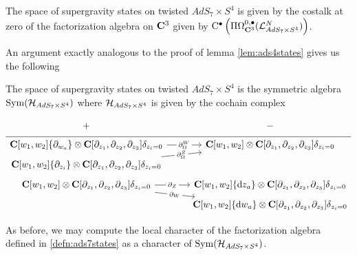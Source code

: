 \documentclass[../main.tex]{subfiles}
\begin{document}
\begin{defn}\label{defn:ads7states}
The space of supergravity states on twisted $AdS_7\times S^4$ is given by the costalk at zero of the factorization algebra on $\mathbf{C}^3$ given by ${\mathrm{C}}^\bullet \left (\Pi \Omega^{0,\bullet}_{\mathbf{C}^3} (\mathcal{L}^N_{AdS_7\times S^4} ) \right )$.
\end{defn}

\parsec{}
An argument exactly analogous to the proof of lemma \ref{lem:ads4states} gives us the following

\begin{lem}
The space of supergravity states on twisted $AdS_7\times S^4$ is the symmetric algebra $\text{Sym} (\mathcal{H}_{AdS_7\times S^4} )$ where $\mathcal{H}_{AdS_7\times S^4}$ is given by the cochain complex

 \begin{equation} 
 \begin{tikzcd}[row sep = 1 ex]
    + & - \\ \hline
\C[w_1,w_2] \{\partial_{w_a}\} \otimes \C[\del_{z_1}, \del_{z_2}, \del_{z_3}]\delta_{z_i=0}\ar[r, "\del^W_\Omega" description] & \C[w_1,w_2]  \otimes \C[\del_{z_1}, \del_{z_2}, \del_{z_3}]\delta_{z_i=0} \\
\C[w_1,w_2]  \{\del_{z_i}\}  \otimes \C[\del_{z_1}, \del_{z_2}, \del_{z_3}]\delta_{z_i=0}\ar[ur, "\del^Z_\Omega" description] \\
\C[w_1,w_2] \otimes \C[\del_{z_1}, \del_{z_2}, \del_{z_3}]\delta_{z_i=0}\ar[r, "\del_Z" description]\ar[dr, "\del_W" description] & \C[w_1,w_2] \{\d z_a\} \otimes \C[\del_{z_1}, \del_{z_2}, \del_{z_3}]\delta_{z_i=0} \\ & \C[w_1, w_2] \{\d w_a\} \otimes \C[\del_{z_1}, \del_{z_2}, \del_{z_3}]\delta_{z_i=0}
\end{tikzcd}
\end{equation}
\end{lem}

\parsec{}
As before, we may compute the local character of the factorization algebra defined in \ref{defn:ads7states} as a character of $\text{Sym} (\mathcal{H}_{AdS_7\times S^4})$. 
\end{document}
